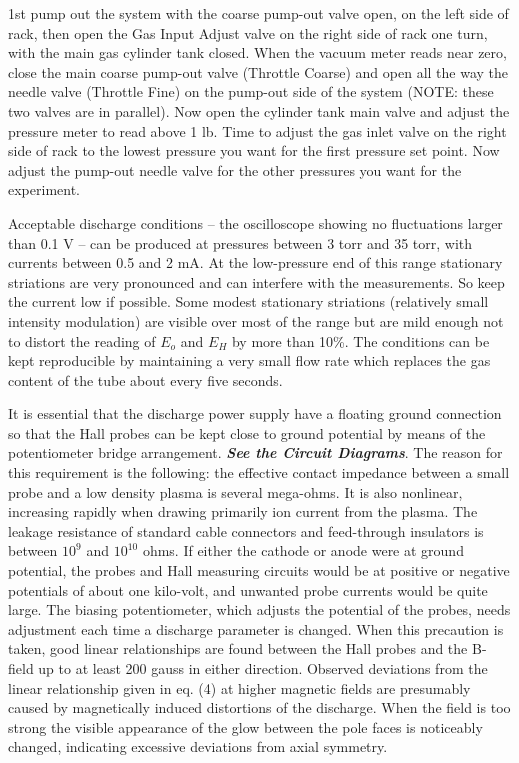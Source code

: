 \documentclass{../lab}
\begin{document}
1st pump out the system with the coarse pump-out valve open, on the left side of rack, then open the Gas Input Adjust valve on the right side of rack one turn, with the main gas cylinder tank closed. When the vacuum meter reads near zero, close the main coarse pump-out valve (Throttle Coarse) and open all the way the needle valve (Throttle Fine) on the pump-out side of the system (NOTE: these two valves are in parallel). Now open the cylinder tank main valve and adjust the pressure meter to read above 1 lb. Time to adjust the gas inlet valve on the right side of rack to the lowest pressure you want for the first pressure set point. Now adjust the pump-out needle valve for the other pressures you want for the experiment.

Acceptable discharge conditions -- the oscilloscope showing no fluctuations larger than 0.1 V -- can be produced at pressures between 3 torr and 35 torr, with currents between 0.5 and 2 mA. At the low-pressure end of this range stationary striations are very pronounced and can interfere with the measurements. So keep the current low if possible. Some modest stationary striations (relatively small intensity modulation) are visible over most of the range but are mild enough not to distort the reading of $E_o$ and $E_H$ by more than 10\%. The conditions can be kept reproducible by maintaining a very small flow rate which replaces the gas content of the tube about every five seconds.

It is essential that the discharge power supply have a floating ground connection so that the Hall probes can be kept close to ground potential by means of the potentiometer bridge arrangement. \emph{\textbf{See the Circuit Diagrams}}. The reason for this requirement is the following: the effective contact impedance between a small probe and a low density plasma is several mega-ohms. It is also nonlinear, increasing rapidly when drawing primarily ion current from the plasma. The leakage resistance of standard cable connectors and feed-through insulators is between $10^9$ and $10^{10}$ ohms. If either the cathode or anode were at ground potential, the probes and Hall measuring circuits would be at positive or negative potentials of about one kilo-volt, and unwanted probe currents would be quite large. The biasing potentiometer, which adjusts the potential of the probes, needs adjustment each time a discharge parameter is changed. When this precaution is taken, good linear relationships are found between the Hall probes and the B-field up to at least 200 gauss in either direction. Observed deviations from the linear relationship given in eq. (4) at higher magnetic fields are presumably caused by magnetically induced distortions of the discharge. When the field is too strong the visible appearance of the glow between the pole faces is noticeably changed, indicating excessive deviations from axial symmetry.
\end{document}
